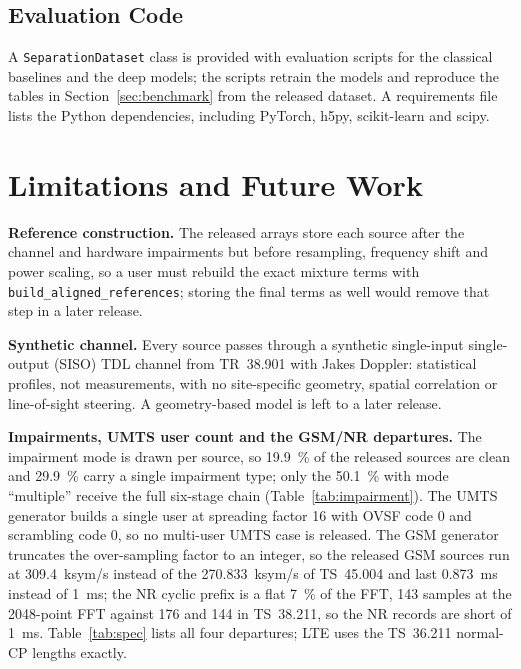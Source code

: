 \documentclass[journal]{IEEEtran}
\begin{document}
\subsection{Evaluation Code}

A \texttt{SeparationDataset} class is provided with evaluation scripts for
the classical baselines and the deep models; the scripts retrain the models and
reproduce the tables in Section~\ref{sec:benchmark} from the released dataset. A
requirements file lists the Python dependencies, including PyTorch, h5py,
scikit-learn and scipy.

\section{Limitations and Future Work}
\label{sec:limitations}

\textbf{Reference construction.} The released arrays store each source after the channel and
hardware impairments but before resampling, frequency shift and power scaling, so a
user must rebuild the exact mixture terms with
\texttt{build\_aligned\_references}; storing the final terms as well would remove
that step in a later release.

\textbf{Synthetic channel.} Every source passes through a synthetic single-input
single-output (SISO) TDL channel from TR~38.901 with Jakes Doppler: statistical
profiles, not measurements, with no site-specific geometry, spatial correlation or
line-of-sight steering. A geometry-based model is left to a later release.

\textbf{Impairments, UMTS user count and the GSM/NR departures.} The impairment
mode is drawn per source, so 19.9~\% of the released sources are clean and
29.9~\% carry a single impairment type; only the 50.1~\% with mode ``multiple''
receive the full six-stage chain (Table~\ref{tab:impairment}). The UMTS generator
builds a single user at spreading factor 16 with OVSF code 0 and scrambling code
0, so no multi-user UMTS case is released. The GSM generator truncates the
over-sampling factor to an integer, so the released GSM sources run at
309.4~ksym/s instead of the 270.833~ksym/s of TS~45.004 and last 0.873~ms instead
of 1~ms; the NR cyclic prefix is a flat 7~\% of the FFT, 143 samples at the
2048-point FFT against 176 and 144 in TS~38.211, so the NR records are short of
1~ms. Table~\ref{tab:spec} lists all four departures; LTE uses the TS~36.211
normal-CP lengths exactly.
\end{document}
